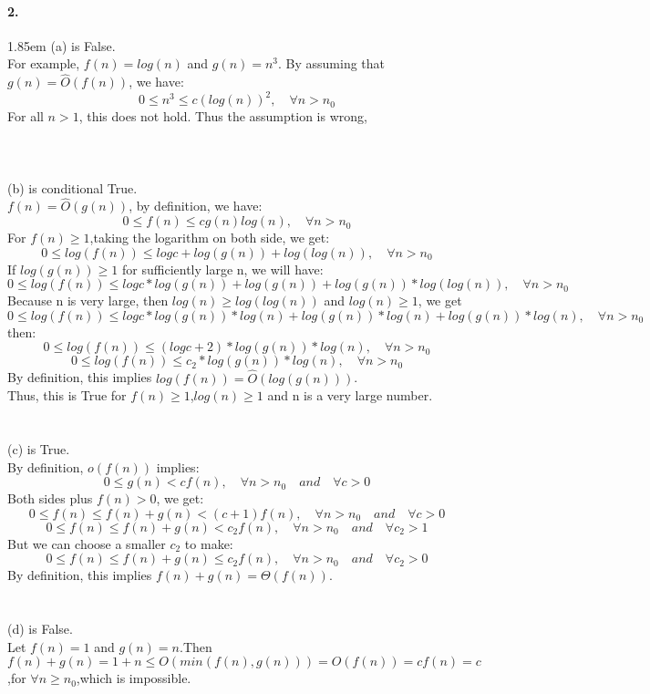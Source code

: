 \documentclass[12pt]{article}
\begin{document}
\paragraph{2.}
\hangindent 1.85em
\noindent
(a) is False.
\\For example, $f(n)=log(n)$ and $g(n)=n^3$. By assuming that $g(n)=\hat{O}(f(n))$, we have:
\[
	0\leq n^3\leq c(log(n))^2,  \quad  \forall n>n_0
\]
For all $n>1$, this does not hold. Thus the assumption is wrong,
\\
\\
\\
\\(b) is conditional True. 
\\$f(n)=\hat{O}(g(n))$, by definition, we have:
\[
	0\leq f(n)\leq cg(n)log(n), \quad \forall n>n_0
\]
For $f(n)\geq1$,taking the logarithm on both side, we get:
\[
	0\leq log(f(n))\leq logc+log(g(n))+log(log(n)), \quad \forall n>n_0
\]
If $log(g(n))\geq1$ for sufficiently large n, we will have:
\[
	0\leq log(f(n))\leq logc*log(g(n))+log(g(n))+log(g(n))*log(log(n)), \quad \forall n>n_0
\]
Because n is very large, then $log(n)\geq log(log(n))$ and $log(n)\geq 1$, we get
\[
	0\leq log(f(n))\leq logc*log(g(n))*log(n)+log(g(n))*log(n)+log(g(n))*log(n), \quad \forall n>n_0
\]
then:
\[
	0\leq log(f(n))\leq (logc+2)*log(g(n))*log(n), \quad \forall n>n_0
\]
\[
	0\leq log(f(n))\leq c_2*log(g(n))*log(n), \quad \forall n>n_0
\]
By definition, this implies $log(f(n))=\hat{O}(log(g(n)))$.
\\Thus, this is True for $f(n)\geq1$,$log(n)\geq1$ and n is a very large number.
\\
\\
\\
(c) is True.
\\By definition, $o(f(n))$ implies:
\[
	0\leq g(n) < cf(n), \quad \forall n > n_0 \quad and \quad \forall c > 0
\]
Both sides plus $f(n)>0$, we get:
\[
	0\leq f(n) \leq f(n)+g(n) < (c+1)f(n), \quad \forall n > n_0 \quad and \quad \forall c > 0
\]
\[
	0\leq f(n) \leq f(n)+g(n) < c_2f(n), \quad \forall n > n_0 \quad and \quad \forall c_2 > 1
\]
But we can choose a smaller $c_2$ to make:
\[
	0\leq f(n) \leq f(n)+g(n) \leq c_2f(n), \quad \forall n > n_0 \quad and \quad \forall c_2 > 0
\]
By definition, this implies $f(n)+g(n)=\Theta(f(n))$.
\\
\\
\\
(d) is False.
\\Let $f(n)=1$ and $g(n)=n$.Then $f(n)+g(n)=1+n\leq O(min(f(n),g(n)))=O(f(n))=cf(n)=c$,for $\forall n\geq n_0$,which is impossible.
\end{document}
